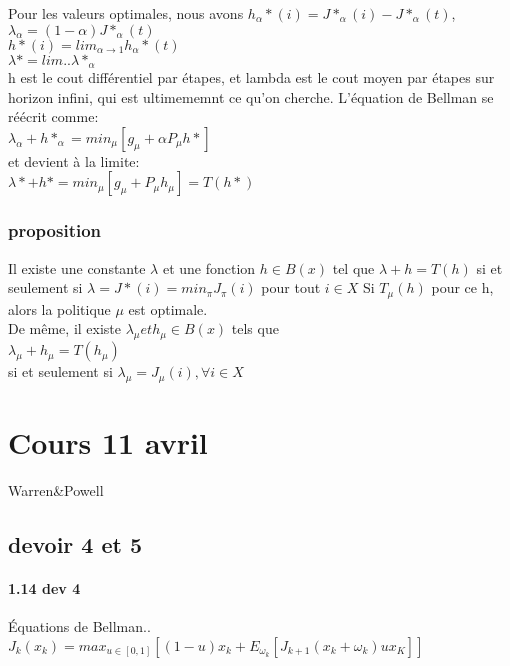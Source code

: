 \documentclass[oneside]{book}
\begin{document}
Pour les valeurs optimales, nous avons $h_{\alpha}*(i) = J*_{\alpha}(i) - J*_{\alpha}(t)$, $\lambda_{\alpha} = (1 - \alpha) J*_{\alpha}(t)$\\

$h*(i) = lim_{\alpha \rightarrow 1}h_{\alpha}*(t)$\\
$\lambda* = lim..\lambda*_{\alpha}$\\


h est le cout différentiel par étapes, et lambda est le cout moyen par étapes sur horizon infini, qui est ultimememnt ce qu'on cherche. L'équation de Bellman se réécrit comme:\\

$\lambda_{\alpha} + h*_{\alpha} = min_{\mu}[g_{\mu} + \alpha P_{\mu}h*]$\\

et devient à la limite:\\

$\lambda* + h* = min_{\mu}[g_{\mu} + P_{\mu}h_{\mu}] = T(h*)$\\

\subsubsection{proposition}
Il existe une constante $\lambda$ et une fonction $h \in B(x)$ tel que $\lambda + h = T(h)$ si et seulement si $\lambda = J*(i) = min_{\pi}J_{\pi}(i)$ pour tout $i \in X$ Si $T_{\mu}(h)$ pour ce h, alors la politique $\mu$ est optimale.\\

De même, il existe $\lambda_{\mu} et h_{\mu} \in B(x)$ tels que \\

$\lambda_{\mu} + h_{\mu} = T(h_{\mu})$\\

si et seulement si $\lambda_{\mu} = J_{\mu}(i), \forall i \in X$\\

\section{Cours 11 avril}
Warren\&Powell

\subsection{devoir 4 et 5}
\paragraph{1.14 dev 4}
Équations de Bellman..\\
$J_k(x_k) = max_{u \in [0,1]}[(1-u)x_k + E_{\omega_k}[J_{k+1}(x_k + \omega_k)ux_K]]$\\
\end{document}
